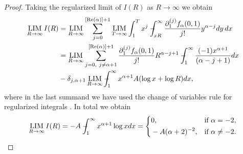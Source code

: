 \begin{proof}
Taking the regularized limit of $I(R)$ as $R\to \infty$ we obtain
\begin{equation}
\begin{split}
\LIM_{R\to \infty}I(R)&=\LIM_{R\to \infty}\sum_{j=0}^{[\textup{Re}(\A)]+1} 
\LIM_{T\to\infty} \int_1^T x^{j} \regint_{xR}^\infty  
\frac{\partial_1^{(j)}f_\A(0,1)}{j!} y^{\A-j} dy \, dx\\
&= \LIM_{R\to \infty}\sum_{j=0, \ j\neq \A+1}^{[\textup{Re}(\A)]+1} \frac{\partial_1^{(j)}f_\A(0,1)}{j!}
R^{\A-j+1} \regint_1^\infty \frac{(-1)x^{\A+1}}{(\A-j+1)} dx \\
&- \delta_{j,\A+1} \LIM_{R\to \infty} \regint_1^\infty x^{\A+1} A (\log x+\log R) dx,
\end{split}
\end{equation}
where in the last summand we have used the change of variables rule for 
regularized integrals \cite[Lemma 2.1.4]{Les:OFT}. In total we obtain
\begin{equation}
\label{fubini-2}
\operatorname*{LIM}_{R\to \infty}I(R)= - A -\hspace*{-1em}\int_1^\infty x^{\mathrm{\alpha}+1} \log x dx =
\left\{
\begin{split}
&0, &\textup{if} \ \mathrm{\alpha}=-2, \\
&- A (\mathrm{\alpha}+2)^{-2}, &\textup{if} \ \mathrm{\alpha}\neq-2. 
\end{split}
\right.
\end{equation}


\end{proof}
